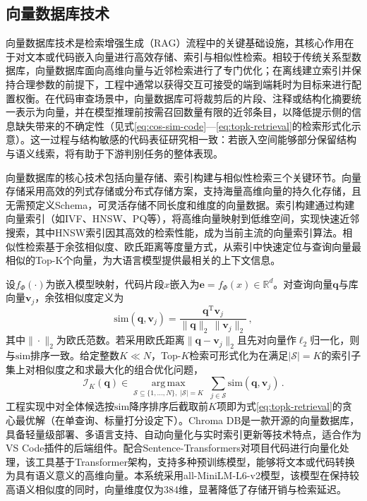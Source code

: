 \subsection{向量数据库技术}

向量数据库技术是检索增强生成（RAG）流程中的关键基础设施，其核心作用在于对文本或代码嵌入向量进行高效存储、索引与相似性检索。相较于传统关系型数据库，向量数据库面向高维向量与近邻检索进行了专门优化；在离线建立索引并保持合理参数的前提下，工程中通常以获得交互可接受的端到端耗时为目标来进行配置权衡。在代码审查场景中，向量数据库可将裁剪后的片段、注释或结构化摘要统一表示为向量，并在模型推理前按需召回数量有限的近邻条目，以降低提示侧的信息缺失带来的不确定性（见式\eqref{eq:cos-sim-code}—\eqref{eq:topk-retrieval}的检索形式化示意）。这一过程与结构敏感的代码表征研究相一致：若嵌入空间能够部分保留结构与语义线索，将有助于下游判别任务的整体表现\cite{guo2020graphcodebert,feng2020codebert}。

向量数据库的核心技术包括向量存储、索引构建与相似性检索三个关键环节。向量存储采用高效的列式存储或分布式存储方案，支持海量高维向量的持久化存储，且无需预定义Schema，可灵活存储不同长度和维度的向量数据。索引构建通过构建向量索引（如IVF、HNSW、PQ等），将高维向量映射到低维空间，实现快速近邻搜索，其中HNSW索引因其高效的检索性能，成为当前主流的向量索引算法。相似性检索基于余弦相似度、欧氏距离等度量方式，从索引中快速定位与查询向量最相似的Top-K个向量，为大语言模型提供最相关的上下文信息。

设$f_\Phi(\cdot)$为嵌入模型映射，代码片段$x$嵌入为$\mathbf{e}=f_\Phi(x)\in\mathbb{R}^{d}$。对查询向量$\mathbf{q}$与库向量$\mathbf{v}_{j}$，余弦相似度定义为
\begin{equation}
\mathrm{sim}(\mathbf{q},\mathbf{v}_{j})=\frac{\mathbf{q}^{\mathrm{T}}\mathbf{v}_{j}}{\|\mathbf{q}\|_{2}\,\|\mathbf{v}_{j}\|_{2}}\,,
\label{eq:cos-sim-code}
\end{equation}
其中$\|\cdot\|_{2}$为欧氏范数。若采用欧氏距离$\|\mathbf{q}-\mathbf{v}_{j}\|_{2}$且先对向量作$\ell_2$归一化，则与$\mathrm{sim}$排序一致。给定整数$K\ll N$，Top-$K$检索可形式化为在满足$|\mathcal{S}|=K$的索引子集上对相似度之和求最大化的组合优化问题，
\begin{equation}
\mathcal{I}_{K}(\mathbf{q})\in
\operatorname*{arg\,max}_{\mathcal{S}\subseteq\{1,\ldots,N\},\;|\mathcal{S}|=K}
\;\sum_{j\in \mathcal{S}} \mathrm{sim}(\mathbf{q},\mathbf{v}_{j})\,.
\label{eq:topk-retrieval}
\end{equation}
工程实现中对全体候选按$\mathrm{sim}$降序排序后截取前$K$项即为式\eqref{eq:topk-retrieval}的贪心最优解（在单查询、标量打分设定下）。Chroma DB是一款开源的向量数据库，具备轻量级部署、多语言支持、自动向量化与实时索引更新等技术特点，适合作为VS Code插件的后端组件。配合Sentence-Transformers对项目代码进行向量化处理，该工具基于Transformer架构，支持多种预训练模型，能够将文本或代码转换为具有语义意义的高维向量。本系统采用all-MiniLM-L6-v2模型，该模型在保持较高语义相似度的同时，向量维度仅为384维，显著降低了存储开销与检索延迟。


